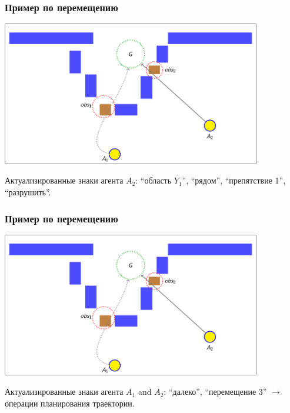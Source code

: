 \documentclass[default]{beamer}
\begin{document}
	\begin{frame}
		\frametitle{Пример по перемещению}
		
		\begin{center}
			\includegraphics[page=95,width=0.85\textwidth]{examples/slides_colored}
		\end{center}
		\par\bigskip
		Актуализированные знаки агента $A_2$: ``область $Y_1$'', ``рядом'', ``препятствие 1'', ``разрушить''.
	\end{frame}
	
	\begin{frame}
		\frametitle{Пример по перемещению}
		
		\begin{center}
			\includegraphics[page=116,width=0.85\textwidth]{examples/slides_colored}
		\end{center}
		\par\bigskip
		Актуализированные знаки агента $A_1$ and $A_2$: ``далеко'', ``перемещение 3'' $\rightarrow$ \color{green!70!black} операции планирования траектории.
	\end{frame}
	
\end{document}
